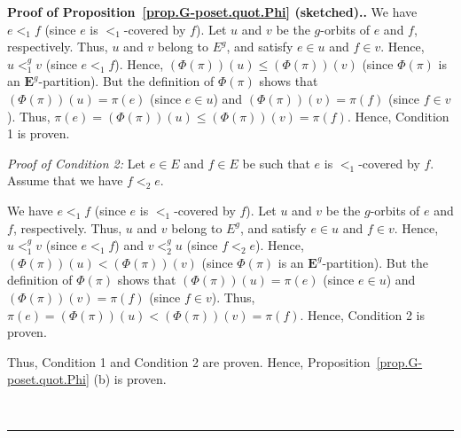 \documentclass[numbers=enddot,12pt,final,onecolumn,notitlepage,abstracton]{scrartcl}%
\theoremstyle{definition}
\newenvironment{proof}[1][Proof]{\noindent\textbf{#1.} }{\ \rule{0.5em}{0.5em}}
\newcommand{\EE}{{\mathbf{E}}}
\begin{document}
\begin{proof}[Proof of Proposition~\ref{prop.G-poset.quot.Phi} (sketched).]
We have $e<_{1}f$ (since $e$ is $<_{1}$-covered by $f$). Let $u$ and $v$ be
the $g$-orbits of $e$ and $f$, respectively. Thus, $u$ and $v$ belong to
$E^{g}$, and satisfy $e \in u$ and $f \in v$. Hence,
$u<_{1}^g v$ (since $e<_{1}f$). Hence, $\left(  \Phi\left(
\pi\right)  \right)  \left(  u\right)  \leq\left(  \Phi\left(  \pi\right)
\right)  \left(  v\right)  $ (since $\Phi\left(  \pi\right)  $ is an
$\EE^{g}$-partition). But the definition of $\Phi\left(  \pi\right)  $
shows that $\left(  \Phi\left(  \pi\right)  \right)  \left(  u\right)
=\pi\left(  e\right)  $ (since $e\in u$) and $\left(  \Phi\left(  \pi\right)
\right)  \left(  v\right)  =\pi\left(  f\right)  $ (since $f\in v$). Thus,
$\pi\left(  e\right)  =\left(  \Phi\left(  \pi\right)  \right)  \left(
u\right)  \leq\left(  \Phi\left(  \pi\right)  \right)  \left(  v\right)
=\pi\left(  f\right)  $. Hence, Condition 1 is proven.

\textit{Proof of Condition 2:} Let $e\in E$ and $f\in E$ be such that $e$ is
$<_{1}$-covered by $f$. Assume that we have $f<_{2}e$.

We have $e<_{1}f$ (since $e$ is $<_{1}$-covered by $f$). Let $u$ and $v$ be
the $g$-orbits of $e$ and $f$, respectively. Thus, $u$ and $v$ belong to
$E^{g}$, and satisfy $e \in u$ and $f \in v$. Hence,
$u<_{1}^g v$ (since $e<_{1}f$) and $v<_{2}^g u$ (since
$f<_{2}e$). Hence, $\left(  \Phi\left(  \pi\right)  \right)  \left(  u\right)
<\left(  \Phi\left(  \pi\right)  \right)  \left(  v\right)  $ (since
$\Phi\left(  \pi\right)  $ is an $\EE^{g}$-partition). But the
definition of $\Phi\left(  \pi\right)  $ shows that $\left(  \Phi\left(
\pi\right)  \right)  \left(  u\right)  =\pi\left(  e\right)  $ (since $e\in
u$) and $\left(  \Phi\left(  \pi\right)  \right)  \left(  v\right)
=\pi\left(  f\right)  $ (since $f\in v$). Thus, $\pi\left(  e\right)  =\left(
\Phi\left(  \pi\right)  \right)  \left(  u\right)  <\left(  \Phi\left(
\pi\right)  \right)  \left(  v\right)  =\pi\left(  f\right)  $. Hence,
Condition 2 is proven.

Thus, Condition 1 and Condition 2 are proven. Hence,
Proposition~\ref{prop.G-poset.quot.Phi} (b) is proven.



\end{proof}
\end{document}
